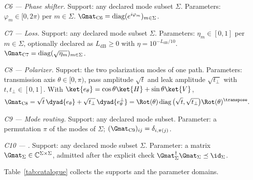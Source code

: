 \begin{definition}
\emph{C6 --- Phase shifter.} Support: any declared mode subset $\Sigma$.
Parameters: $\varphi_m\in[0,2\pi)$ per $m\in\Sigma$.
$\Gmat_{\mathrm{C6}}=\operatorname{diag}(e^{i\varphi_m})_{m\in\Sigma}$.

\emph{C7 --- Loss.} Support: any declared mode subset $\Sigma$. Parameters:
$\eta_m\in[0,1]$ per $m\in\Sigma$, optionally declared as
$L_{\mathrm{dB}}\ge0$ with $\eta=10^{-L_{\mathrm{dB}}/10}$.
$\Gmat_{\mathrm{C7}}=\operatorname{diag}(\sqrt{\eta_m})_{m\in\Sigma}$.

\emph{C8 --- Polarizer.} Support: the two polarization modes of one path.
Parameters: transmission axis $\theta\in[0,\pi)$, pass amplitude $\sqrt{t}$ and
leak amplitude $\sqrt{t_\perp}$ with $t,t_\perp\in[0,1]$. With
$\ket{e_\theta}=\cos\theta\ket{H}+\sin\theta\ket{V}$,
\begin{equation}\label{eq:polarizer}
  \Gmat_{\mathrm{C8}}
  =\sqrt{t}\,\dyad{e_\theta}+\sqrt{t_\perp}\,\dyad{e_\theta^{\perp}}
  =\Rot(\theta)\operatorname{diag}\big(\sqrt{t},\sqrt{t_\perp}\big)
   \Rot(\theta)^{\transpose}.
\end{equation}

\emph{C9 --- Mode routing.} Support: any declared mode subset.
Parameter: a permutation $\pi$ of the modes of $\Sigma$;
$(\Gmat_{\mathrm{C9}})_{ij}=\delta_{i,\pi(j)}$.

\emph{C10 --- .} Support: any declared mode subset $\Sigma$.
Parameter: a matrix $\Gmat_\Sigma\in\mathbb{C}^{\Sigma\times\Sigma}$, admitted
after the explicit check $\Gmat_\Sigma^\dagger\Gmat_\Sigma\preceq\id_\Sigma$.

Table~\ref{tab:catalogue} collects the supports and the parameter domains.


\end{definition}
